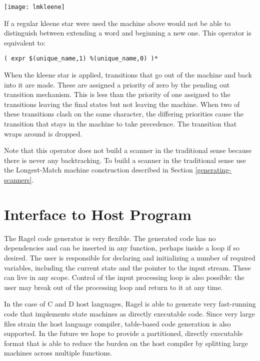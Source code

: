 \documentclass[letterpaper,11pt,oneside]{book}
\newcommand{\verbspace}{\vspace{10pt}}
\newcommand{\graphspace}{\vspace{10pt}}
\begin{document}
\begin{center}
\texttt{[image: lmkleene]}
\end{center}
\graphspace

If a regular kleene star were used the machine above would not be able to
distinguish between extending a word and beginning a new one.  This operator is
equivalent to:

\verbspace
\begin{verbatim}
( expr $(unique_name,1) %(unique_name,0) )*
\end{verbatim}
\verbspace

When the kleene star is applied, transitions that go out of the machine and
back into it are made. These are assigned a priority of zero by the pending out
transition mechanism. This is less than the priority of one assigned to the
transitions leaving the final states but not leaving the machine. When two of
these transitions clash on the same character, the differing priorities cause
the transition that stays in the machine to take precedence.  The transition
that wraps around is dropped.

Note that this operator does not build a scanner in the traditional sense
because there is never any backtracking. To build a scanner in the traditional
sense use the Longest-Match machine construction described in Section
\ref{generating-scanners}.

\chapter{Interface to Host Program}

The Ragel code generator is very flexible. The generated code has no
dependencies and can be inserted in any function, perhaps inside a loop if so
desired.  The user is responsible for declaring and initializing a number of
required variables, including the current state and the pointer to the input
stream. These can live in any scope. Control of the input processing loop is
also possible: the user may break out of the processing loop and return to it
at any time.

In the case of C and D host languages, Ragel is able to generate very
fast-running code that implements state machines as directly executable code.
Since very large files strain the host language compiler, table-based code
generation is also supported. In the future we hope to provide a partitioned,
directly executable format that is able to reduce the burden on the host
compiler by splitting large machines across multiple functions.
\end{document}
